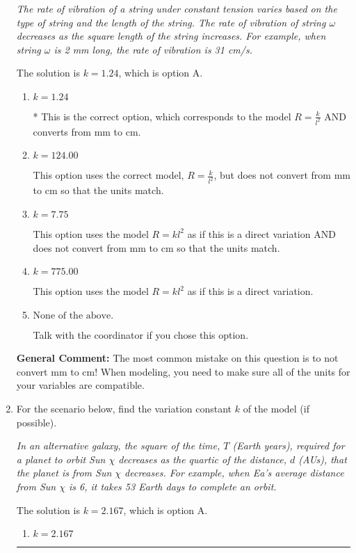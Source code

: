\documentclass{extbook}[14pt]
\newcommand{\litem}[1]{\item #1

\rule{\textwidth}{0.4pt}}
\begin{document}
\begin{enumerate}
{\begin{center}
    \textit{ The rate of vibration of a string under constant tension varies based on the type of string and the length of the string. The rate of vibration of string $\omega$ decreases as the square length of the string increases. For example, when string $\omega$ is 2 mm long, the rate of vibration is 31 cm/s. }
\end{center}


The solution is \( k = 1.24 \), which is option A.\begin{enumerate}[label=\Alph*.]
\item \( k = 1.24 \)

* This is the correct option, which corresponds to the model $R = \frac{k}{l^{2}}$ AND converts from mm to cm.
\item \( k = 124.00 \)

This option uses the correct model, $R = \frac{k}{l^{2}}$, but does not convert from mm to cm so that the units match.
\item \( k = 7.75 \)

This option uses the model $R = kl^{2}$ as if this is a direct variation AND does not convert from mm to cm so that the units match.
\item \( k = 775.00 \)

This option uses the model $R = kl^{2}$ as if this is a direct variation.
\item \( \text{None of the above.} \)

Talk with the coordinator if you chose this option.
\end{enumerate}

\textbf{General Comment:} The most common mistake on this question is to not convert mm to cm! When modeling, you need to make sure all of the units for your variables are compatible.
}
\litem{
For the scenario below, find the variation constant $k$ of the model (if possible).

\begin{center}
    \textit{ In an alternative galaxy, the square of the time, $T$ (Earth years), required for a planet to orbit Sun $\chi$ decreases as the quartic of the distance, $d$ (AUs), that the planet is from Sun $\chi$ decreases. For example, when Ea's average distance from Sun $\chi$ is 6, it takes 53 Earth days to complete an orbit. }
\end{center}


The solution is \( k = 2.167 \), which is option A.\begin{enumerate}[label=\Alph*.]
\item \( k = 2.167 \)


\end{enumerate}}
\end{enumerate}
\end{document}
